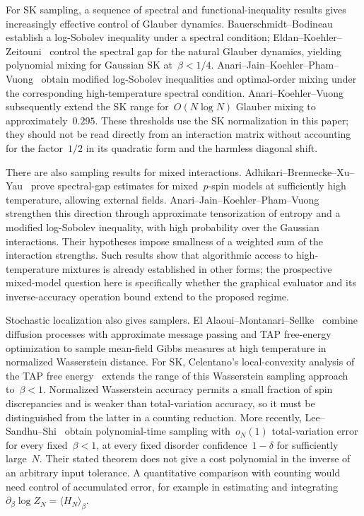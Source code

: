 \documentclass[10pt]{article}
\theoremstyle{plain}
\theoremstyle{definition}
\theoremstyle{remark}
\begin{document}
For SK sampling, a sequence of spectral and functional-inequality results gives increasingly effective control of Glauber dynamics. Bauerschmidt--Bodineau~\cite{BB19} establish a log-Sobolev inequality under a spectral condition; Eldan--Koehler--Zeitouni~\cite{EKZ22} control the spectral gap for the natural Glauber dynamics, yielding polynomial mixing for Gaussian SK at~$\beta<1/4$. Anari--Jain--Koehler--Pham--Vuong~\cite{AJKPV22} obtain modified log-Sobolev inequalities and optimal-order mixing under the corresponding high-temperature spectral condition. Anari--Koehler--Vuong~\cite{AKV24} subsequently extend the SK range for~$O(N\log N)$ Glauber mixing to approximately~$0.295$. These thresholds use the SK normalization in this paper; they should not be read directly from an interaction matrix without accounting for the factor~$1/2$ in its quadratic form and the harmless diagonal shift.

There are also sampling results for mixed interactions. Adhikari--Brennecke--Xu--Yau~\cite{ABXY24} prove spectral-gap estimates for mixed~$p$-spin models at sufficiently high temperature, allowing external fields. Anari--Jain--Koehler--Pham--Vuong~\cite{AJKPV24} strengthen this direction through approximate tensorization of entropy and a modified log-Sobolev inequality, with high probability over the Gaussian interactions. Their hypotheses impose smallness of a weighted sum of the interaction strengths. Such results show that algorithmic access to high-temperature mixtures is already established in other forms; the prospective mixed-model question here is specifically whether the graphical evaluator and its inverse-accuracy operation bound extend to the proposed regime.

Stochastic localization also gives samplers. El Alaoui--Montanari--Sellke~\cite{AMS25} combine diffusion processes with approximate message passing and TAP free-energy optimization to sample mean-field Gibbs measures at high temperature in normalized Wasserstein distance. For SK, Celentano's local-convexity analysis of the TAP free energy~\cite{Cel24} extends the range of this Wasserstein sampling approach to~$\beta<1$. Normalized Wasserstein accuracy permits a small fraction of spin discrepancies and is weaker than total-variation accuracy, so it must be distinguished from the latter in a counting reduction. More recently, Lee--Sandhu--Shi~\cite[Theorem~1.1]{LSS26} obtain polynomial-time sampling with~$o_N(1)$ total-variation error for every fixed~$\beta<1$, at every fixed disorder confidence~$1-\delta$ for sufficiently large~$N$. Their stated theorem does not give a cost polynomial in the inverse of an arbitrary input tolerance. A quantitative comparison with counting would need control of accumulated error, for example in estimating and integrating~$\partial_\beta\log Z_N=\langle H_N\rangle_\beta$.
\end{document}
